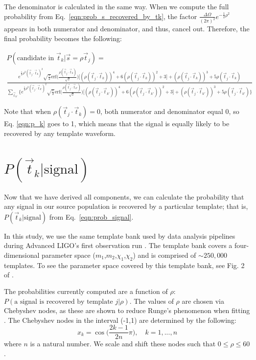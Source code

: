 \documentclass[twocolumn,showpacs,unsortedaddress,superscriptaddress,showkeys,nofootinbib,preprintnumbers,letterpaper]{revtex4-1}
\newcommand{\ptjtk}{\rho(\vec{t}_j\cdot\vec{t}_k)}
\newcommand{\tjtk}{(\vec{t}_j\cdot\vec{t}_k)}
\newcommand{\tjtkk}{(\vec{t}_j\cdot\vec{t}_{k'})}
\newcommand{\ptjtkk}{\rho(\vec{t}_j\cdot\vec{t}_{k'})}
\begin{document}
The denominator is calculated in the same way. When we compute the full probability from Eq.~\ref{eqn:prob_s_recovered_by_tk}, the factor $\frac{\Delta\Omega}{(2\pi)^{2}} e^{-\frac{1}{2}\rho^2}$ appears in both numerator and denominator, and thus, cancel out. Therefore, the final probability becomes the following:
	\begin{widetext}
	\begin{multline}
	P(\text{candidate in }\vec{t}_k|\vec{s}=\rho\vec{t}_j) =\\
	\frac{
	e^{\frac{1}{2}\rho^2\tjtk^2}
	\sqrt{\frac{\pi}{2}}\text{erf}\Big(\frac{\ptjtk}{\sqrt{2}}\Big)\Big[(\ptjtk)^4+6(\ptjtk)^2+3\Big]
	      + (\ptjtk)^3+5\ptjtk
	}{
	{\sum_{\vec{t}_{k'}} \Big\{e^{\frac{1}{2}\rho^2\tjtkk^2} 
	\sqrt{\frac{\pi}{2}}\text{erf}\Big(\frac{\ptjtkk}{\sqrt{2}}\Big)\Big[(\ptjtkk)^4+6(\ptjtkk)^2+3\Big]
	      + (\ptjtkk)^3+5\ptjtkk
	\Big\}
	}}
	\label{eqn:p_k}
	\end{multline}
	\end{widetext}

Note that when $\ptjtk=0$, both numerator and denominator equal 0, so Eq. \ref{eqn:p_k} goes to 1, which means that the signal is equally likely to be recovered by any template waveform.


\section{$P(\vec{t}_k | \text{signal})$} \label{sec:P_jk}

Now that we have derived all components, we can calculate the probability that any signal in our source population is recovered by a particular template; that is, $P(\vec{t}_k | \text{signal})$ from Eq.~\ref{eqn:prob_signal}.

In this study, we use the same template bank used by data analysis pipelines during Advanced LIGO's first observation run \cite{TheLIGOScientific:2016pea}. The template bank covers a four-dimensional parameter space ($m_1$,$m_2$,$\chi_1$,$\chi_2$) and is comprised of $\sim\!250,000$ templates. To see the parameter space covered by this template bank, see Fig. 2 of \cite{TheLIGOScientific:2016pea}.

The probabilities currently computed are a function of $\rho$: $P(\text{a signal is recovered by template }j|\rho)$. The values of $\rho$ are chosen via Chebyshev nodes, as these are shown to reduce Runge's phenomenon when fitting \cite{numericalmethodsMATLAB}. The Chebyshev nodes in the interval (-1,1) are determined by the following:
	\begin{equation}
	x_k = \cos\Big(\frac{2k-1}{2n}\pi\Big), \quad k=1,...,n
	\end{equation}
where $n$ is a natural number. We scale and shift these nodes such that $0\le\rho\le60$.
\end{document}
